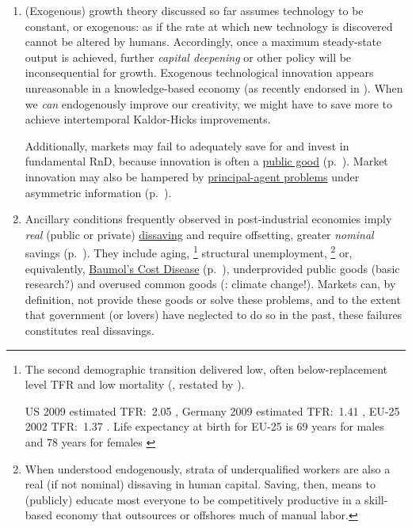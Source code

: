 \begin{enumerate}%
	\item (Exogenous) growth theory discussed so far assumes technology to be constant, or exogenous:
	as if the rate at which new technology is discovered cannot be altered by humans.
	Accordingly, once a maximum steady-state output is achieved, further \emph{capital deepening} or other policy will be inconsequential for growth.
	Exogenous technological innovation appears unreasonable in a knowledge-based economy (as recently endorsed in \citealt{Communities2009}).
	When we \emph{can} endogenously improve our creativity, we might have to save more to achieve intertemporal Kaldor-Hicks improvements.

	Additionally, markets may fail to adequately save for and invest in fundamental \gls{RnD}, because innovation is often a \hyperref[sec:public-good]{public good} (p.~\pageref{sec:public-good}).
	Market innovation may also be hampered by \hyperref[sec:principal-agent-problem]{principal-agent problems} under asymmetric information (p.~\pageref{sec:principal-agent-problem}).

	\item Ancillary conditions frequently observed in post-industrial economies imply \emph{real} (public or private) \hyperref[sec:delta-net-worth]{dissaving} and require offsetting, greater \emph{nominal} savings (p.~\pageref{sec:delta-net-worth}).
	They include aging,
	\footnote{
		The second demographic transition delivered low, often below-replacement level \gls{TFR} and low mortality (\citealt{Davis1945}, restated by \citealt{Caldwell-1976-aa}).

		US 2009 estimated \gls{TFR}:~2.05 \citep{CIA2009}, Germany 2009 estimated \gls{TFR}:~1.41 \citep{CIA2009}, EU-25 2002 \gls{TFR}:~1.37 \citep[2]{Demeny-2003-aa}.
		Life expectancy at birth for EU-25 is 69 years for males and 78 years for females \citep[2]{Demeny-2003-aa}
	}
	structural unemployment,
	\footnote{
		When understood endogenously, strata of underqualified workers are also a real (if not nominal) dissaving in human capital.
		Saving, then, means to (publicly) educate most everyone to be competitively productive in a skill-based economy that outsources or offshores much of manual labor.
	}
	or, equivalently, \hyperref[itm:non-linear-returns]{Baumol's Cost Disease} (p.~\pageref{itm:non-linear-returns}), underprovided public goods (basic research?) and overused common goods (\citealt{Stern-2006-aa}:
	climate change!).
	Markets can, by definition, not provide these goods or solve these problems, and to the extent that government (or lovers) have neglected to do so in the past, these failures constitutes real dissavings.


\end{enumerate}
